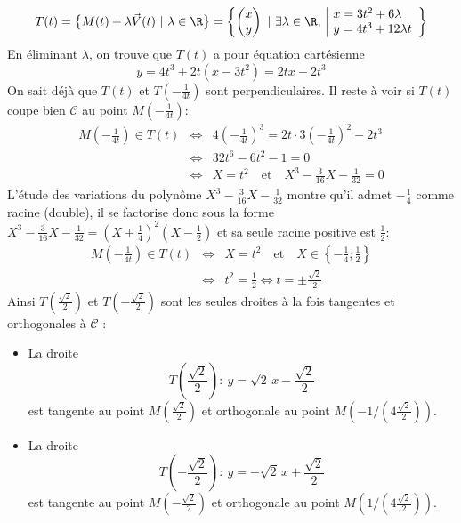 {{$$T(t)=\big\{M(t)+\lambda\vec{V}(t)\ |\ \lambda\in\R\big\}=\left\{\begin{pmatrix}x\\ y\end{pmatrix}\ |\ \exists\lambda\in\R,\ \begin{array}{|l}x=3t^2+6\lambda\\ y=4t^3+12\lambda t\end{array}\right\}$$
En éliminant $\lambda$, on trouve que $T(t)$ a pour équation cartésienne 
$$y=4t^3+2t(x-3t^2)=2tx-2t^3$$
On sait déjà que $T(t)$ et $T(-\frac{1}{4t})$ sont perpendiculaires. Il reste à voir si $T(t)$ coupe bien $\mathcal{C}$ au point $M(-\frac{1}{4t})$:
\begin{eqnarray*}
M\left(-\frac{1}{4t}\right)\in T(t)&\Longleftrightarrow& 4\left(-\frac{1}{4t}\right)^3=2t\cdot 3\left(-\frac{1}{4t}\right)^2-2t^3\\
 &\Longleftrightarrow& 32t^6-6t^2-1=0\\
 &\Longleftrightarrow& X=t^2\quad\mathrm{et}\quad X^3-\frac{3}{16}X-\frac{1}{32}=0
\end{eqnarray*}
L'étude des variations du polyn\^ome $X^3-\frac{3}{16}X-\frac{1}{32}$ montre qu'il admet $-\frac{1}{4}$ comme racine (double), il se factorise donc sous la forme $X^3-\frac{3}{16}X-\frac{1}{32}=(X+\frac{1}{4})^2(X-\frac{1}{2})$ et sa seule racine positive est $\frac{1}{2}$:
\begin{eqnarray*}
M\left(-\frac{1}{4t}\right)\in T(t)&\Longleftrightarrow& X=t^2\quad\mathrm{et}\quad X\in\left\{-\frac{1}{4};\frac{1}{2}\right\}\\
 &\Longleftrightarrow& t^2=\frac{1}{2}\Longleftrightarrow t=\pm\frac{\sqrt{2}}{2}
\end{eqnarray*}
Ainsi $T(\frac{\sqrt{2}}{2})$ et $T(-\frac{\sqrt{2}}{2})$ sont les seules 
droites à la fois tangentes et orthogonales à $\mathcal{C}$ :

\begin{itemize}
\item La droite 
$$T(\frac{\sqrt{2}}{2}):\ y=\sqrt{2}\,x-\frac{\sqrt{2}}{2}$$
est tangente au point $M(\frac{\sqrt{2}}{2})$ et orthogonale au point $M(-1/(4\frac{\sqrt{2}}{2}))$.
\item La droite 
$$T(-\frac{\sqrt{2}}{2}):\ y=-\sqrt{2}\,x+\frac{\sqrt{2}}{2}$$
est tangente au point $M(-\frac{\sqrt{2}}{2})$ et orthogonale au point $M(1/(4\frac{\sqrt{2}}{2}))$.
\end{itemize}
}
}
